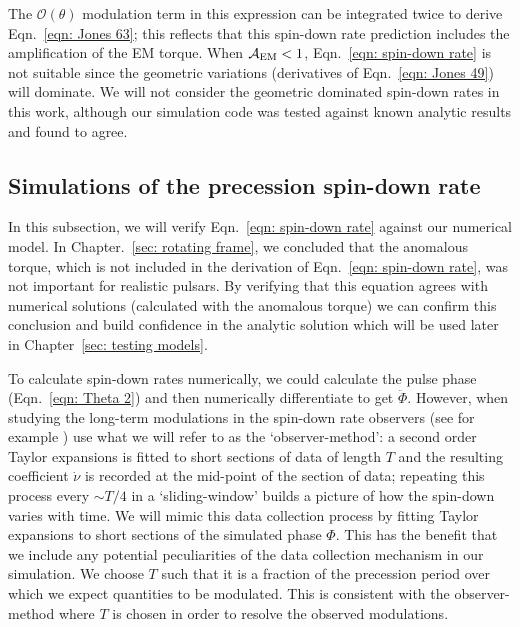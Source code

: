 \documentclass[../full_thesis/full_thesis.tex]{subfiles}
\begin{document}
The $\mathcal{O}(\theta)$ modulation term in this expression can be integrated
twice to derive Eqn.~\eqref{eqn: Jones 63}; this reflects that this
spin-down rate prediction includes the amplification of the EM torque. When
$\mathcal{A}_{\mathrm{EM}} < 1$, Eqn.~\eqref{eqn: spin-down rate} is not suitable since the
geometric variations (derivatives of Eqn.~\eqref{eqn: Jones 49}) will dominate.
We will not consider the geometric dominated spin-down rates in this work,
although our simulation code was tested against known analytic results and
found to agree.

\subsection{Simulations of the precession spin-down rate}
\label{sec: spin-down rate numerical}

In this subsection, we will verify Eqn.~\eqref{eqn: spin-down rate} against our
numerical model. In Chapter.~\ref{sec: rotating frame}, we concluded that the
anomalous torque, which is not included in the derivation of Eqn.~\eqref{eqn:
spin-down rate}, was not important for realistic pulsars. By verifying that
this equation agrees with numerical solutions (calculated with the anomalous
torque) we can confirm this conclusion and build confidence in the analytic
solution which will be used later in Chapter~\ref{sec: testing models}.

 To calculate spin-down rates numerically, we could calculate the pulse phase
(Eqn.~\eqref{eqn: Theta 2}) and then numerically differentiate to get
$\ddot{\Phi}$. However, when studying the long-term modulations in the spin-down
rate observers (see for example \citet{Lyne2010, Perera2015}) use what we will
refer to as the `observer-method': a second order Taylor expansions is
fitted to short sections of data of length $T$ and the resulting coefficient
$\dot{\nu}$ is recorded at the mid-point of the section of data; repeating
this process every $\sim T/4$ in a `sliding-window' builds a picture of how the
spin-down varies with time.  We will mimic this data collection process by
fitting Taylor expansions to short sections of the simulated phase $\Phi$. This
has the benefit that we include any potential peculiarities of the data
collection mechanism in our simulation.  We choose $T$ such that it is a
fraction of the precession period over which we expect quantities to be
modulated. This is consistent with the observer-method where $T$ is chosen in
order to resolve the observed modulations.
\end{document}
